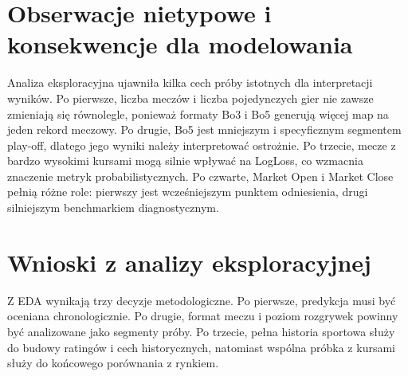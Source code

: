 \section{Obserwacje nietypowe i konsekwencje dla modelowania}

Analiza eksploracyjna ujawniła kilka cech próby istotnych dla interpretacji wyników. Po pierwsze, liczba meczów i liczba pojedynczych gier nie zawsze zmieniają się równolegle, ponieważ formaty Bo3 i Bo5 generują więcej map na jeden rekord meczowy. Po drugie, Bo5 jest mniejszym i specyficznym segmentem play-off, dlatego jego wyniki należy interpretować ostrożnie. Po trzecie, mecze z bardzo wysokimi kursami mogą silnie wpływać na LogLoss, co wzmacnia znaczenie metryk probabilistycznych. Po czwarte, Market Open i Market Close pełnią różne role: pierwszy jest wcześniejszym punktem odniesienia, drugi silniejszym benchmarkiem diagnostycznym.

\section{Wnioski z analizy eksploracyjnej}

Z EDA wynikają trzy decyzje metodologiczne. Po pierwsze, predykcja musi być oceniana chronologicznie. Po drugie, format meczu i poziom rozgrywek powinny być analizowane jako segmenty próby. Po trzecie, pełna historia sportowa służy do budowy ratingów i cech historycznych, natomiast wspólna próbka z kursami służy do końcowego porównania z rynkiem.
